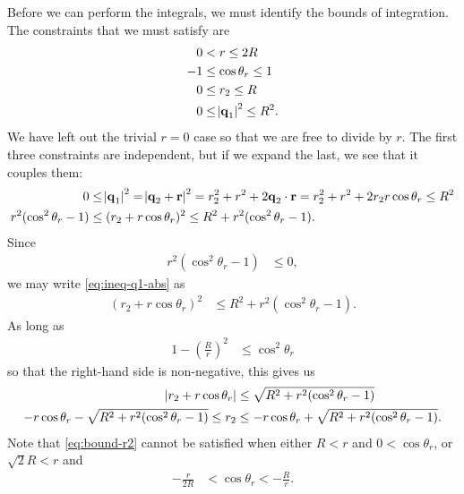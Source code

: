 Before we can perform the integrals, we must identify the bounds of integration.
The constraints that we must satisfy are
\begin{subequations}
\begin{align}
	0
	&< r \le 2 R \\
	-1
	&\le \cos{\theta_r} \le 1 \\
	0
	&\le r_2 \le R \\
	0
	&\le \abs{\bm{\mathbf{q}}_1}^2 \le R^2.
		\label{eq:ineq-q1-abs}
\end{align}
\end{subequations}
We have left out the trivial $r = 0$ case so that we are free to divide by $r$.
The first three constraints are independent, but if we expand the last, we see that it couples them:
\begin{subequations}
\begin{align}
	0
	&\le \abs{\bm{\mathbf{q}}_1}^2
	= \abs{\bm{\mathbf{q}}_2 + \bm{\mathbf{r}}}^2
	= r_2^2 + r^2 + 2 \bm{\mathbf{q}}_2 \cdot \bm{\mathbf{r}}
	= r_2^2 + r^2 + 2 r_2 r \cos{\theta_r}
	\le R^2 \\
	r^2 (\cos^2{\theta_r} - 1)
	&\le (r_2 + r \cos{\theta_r})^2
	\le R^2 + r^2 (\cos^2{\theta_r} - 1).
\end{align}
\end{subequations}
Since
\begin{align}
	r^2 (\cos^2{\theta_r} - 1)
	& \le 0,
\end{align}
we may write \cref{eq:ineq-q1-abs} as
\begin{align}
	(r_2 + r \cos{\theta_r})^2
	&\le R^2 + r^2 (\cos^2{\theta_r} - 1).
\end{align}
As long as
\begin{align}
	1 - \left( \frac{R}{r} \right)^2
	&\le \cos^2{\theta_r}
		\label{eq:bound-cos2}
\end{align}
so that the right-hand side is non-negative, this gives us
\begin{subequations}
\begin{align}
	\abs{r_2 + r \cos{\theta_r}}
	&\le \sqrt{R^2 + r^2 (\cos^2{\theta_r} - 1)} \\
	-r \cos{\theta_r} - \sqrt{R^2 + r^2 (\cos^2{\theta_r} - 1)}
	\le r_2
	&\le -r \cos{\theta_r} + \sqrt{R^2 + r^2 (\cos^2{\theta_r} - 1)}.
		\label{eq:bound-r2}
\end{align}
\end{subequations}
Note that \cref{eq:bound-r2} cannot be satisfied when either $R < r$ and $0 < \cos{\theta_r}$, or $\sqrt{2} R < r$ and
\begin{align}
	-\frac{r}{2 R}
	&< \cos{\theta_r}
	< -\frac{R}{r}.
\end{align}

